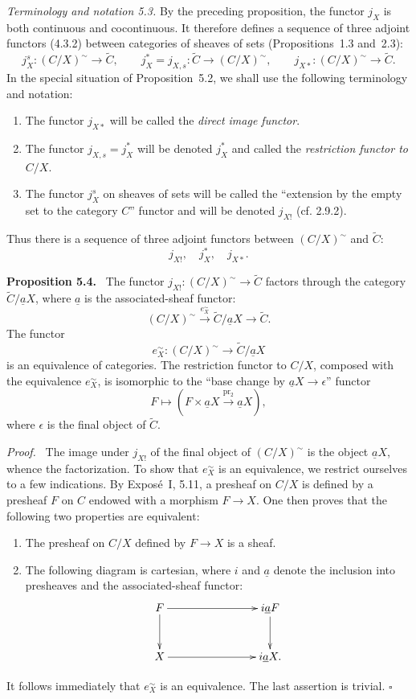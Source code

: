 \documentclass[11pt]{article}
\newcommand{\pr}{\operatorname{pr}}
\newcommand{\qedtext}{\hfill\(\square\)}
\newenvironment{statement}[1]{\par\medskip\noindent\textbf{#1.}\ }{\par\medskip}
\newenvironment{prooftext}{\par\noindent\emph{Proof.}\ }{\par\medskip}
\begin{document}
\noindent\emph{Terminology and notation 5.3.} By the preceding proposition, the functor \(j_X\) is both continuous and cocontinuous. It therefore defines a sequence of three adjoint functors (4.3.2) between categories of sheaves of sets (Propositions~1.3 and~2.3):
\[
j_X^s:(C/X)^{\sim}\to\widetilde C,
\qquad
j_X^{\ast}=j_{X,s}:\widetilde C\to(C/X)^{\sim},
\qquad
j_{X\ast}:(C/X)^{\sim}\to\widetilde C.
\]
In the special situation of Proposition~5.2, we shall use the following terminology and notation:
\begin{enumerate}[label=\arabic*)]
\item The functor \(j_{X\ast}\) will be called the \emph{direct image functor}.
\item The functor \(j_{X,s}=j_X^{\ast}\) will be denoted \(j_X^{\ast}\) and called the \emph{restriction functor to \(C/X\)}.
\item The functor \(j_X^s\) on sheaves of sets will be called the ``extension by the empty set to the category \(C\)'' functor and will be denoted \(j_{X!}\) (cf. 2.9.2).
\end{enumerate}
Thus there is a sequence of three adjoint functors between \((C/X)^{\sim}\) and \(\widetilde C\):
\[
j_{X!},\quad j_X^{\ast},\quad j_{X\ast}.
\]

\begin{statement}{Proposition 5.4}
The functor \(j_{X!}:(C/X)^{\sim}\to\widetilde C\) factors through the category \(\widetilde C/\underline aX\), where \(\underline a\) is the associated-sheaf functor:
\[
(C/X)^{\sim}\xrightarrow{e_X^{\sim}}\widetilde C/\underline aX\to\widetilde C.
\]
The functor
\[
e_X^{\sim}:(C/X)^{\sim}\to\widetilde C/\underline aX
\]
is an equivalence of categories. The restriction functor to \(C/X\), composed with the equivalence \(e_X^{\sim}\), is isomorphic to the ``base change by \(\underline aX\to\epsilon\)'' functor
\[
F\longmapsto (F\times\underline aX\xrightarrow{\pr_2}\underline aX),
\]
where \(\epsilon\) is the final object of \(\widetilde C\).
\end{statement}

\begin{prooftext}
The image under \(j_{X!}\) of the final object of \((C/X)^{\sim}\) is the object \(\underline aX\), whence the factorization. To show that \(e_X^{\sim}\) is an equivalence, we restrict ourselves to a few indications. By Expos\'e~I, 5.11, a presheaf on \(C/X\) is defined by a presheaf \(F\) on \(C\) endowed with a morphism \(F\to X\). One then proves that the following two properties are equivalent:
\begin{enumerate}[label=\roman*)]
\item The presheaf on \(C/X\) defined by \(F\to X\) is a sheaf.
\item The following diagram is cartesian, where \(i\) and \(\underline a\) denote the inclusion into presheaves and the associated-sheaf functor:
\[
\xymatrix@C=2.75cm@R=1cm{
F\ar[r]\ar[d]& i\underline aF\ar[d]\\
X\ar[r]& i\underline aX.
}
\]
\end{enumerate}
It follows immediately that \(e_X^{\sim}\) is an equivalence. The last assertion is trivial. \qedtext
\end{prooftext}
\end{document}
